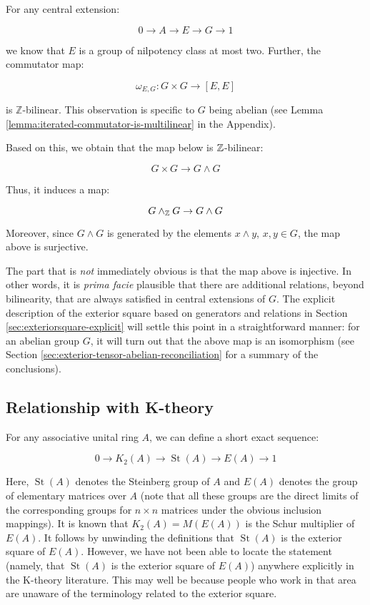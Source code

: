 For any central extension:

$$0 \to A \to E \to G \to 1$$

we know that $E$ is a group of nilpotency class at most two. Further,
the commutator map:

$$\omega_{E,G}: G \times G \to [E,E]$$

is $\mathbb{Z}$-bilinear. This observation is specific to $G$ being
abelian (see Lemma \ref{lemma:iterated-commutator-is-multilinear} in
the Appendix).

Based on this, we obtain that the map below is $\mathbb{Z}$-bilinear:

$$G \times G \to G \wedge G$$

Thus, it induces a map:

$$G \wedge_{\mathbb{Z}} G \to G \wedge G$$

Moreover, since $G \wedge G$ is generated by the elements $x \wedge
y$, $x,y \in G$, the map above is surjective.

The part that is {\em not} immediately obvious is that the map above
is injective. In other words, it is {\em prima facie} plausible that
there are additional relations, beyond bilinearity, that are always
satisfied in central extensions of $G$. The explicit description of
the exterior square based on generators and relations in Section
\ref{sec:exteriorsquare-explicit} will settle this point in a
straightforward manner: for an abelian group $G$, it will turn out
that the above map is an isomorphism (see Section
\ref{sec:exterior-tensor-abelian-reconciliation} for a summary of the
conclusions).

\subsection{Relationship with K-theory}

For any associative unital ring $A$, we can define a short exact
sequence:

$$0 \to K_2(A) \to \operatorname{St}(A) \to E(A) \to 1$$

Here, $\operatorname{St}(A)$ denotes the Steinberg group of $A$ and
$E(A)$ denotes the group of elementary matrices over $A$ (note that
all these groups are the direct limits of the corresponding groups for
$n \times n$ matrices under the obvious inclusion mappings). It is
known that $K_2(A) = M(E(A))$ is the Schur multiplier of $E(A)$. It
follows by unwinding the definitions that $\operatorname{St}(A)$ is
the exterior square of $E(A)$. However, we have not been able to
locate the statement (namely, that $\operatorname{St}(A)$ is the
exterior square of $E(A)$) anywhere explicitly in the K-theory
literature. This may well be because people who work in that area are
unaware of the terminology related to the exterior square.

